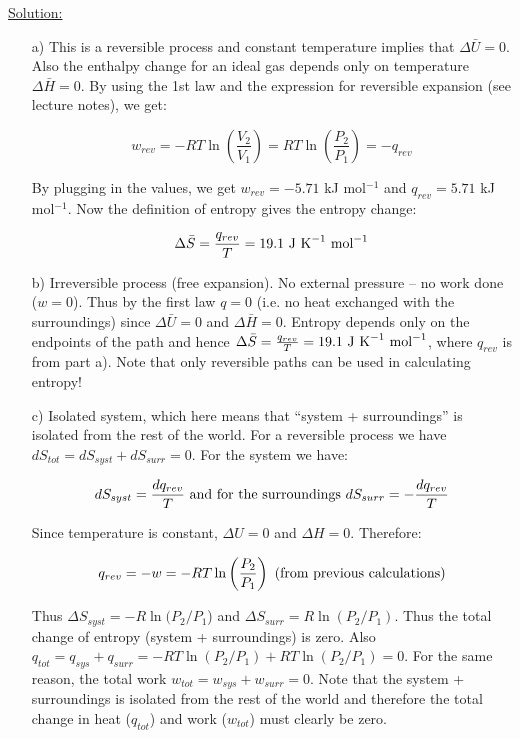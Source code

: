 \noindent
\underline{Solution:}\\

\begin{itemize}

\item[a)] This is a reversible process and constant temperature implies that $\Delta\bar{U} = 0$. Also the enthalpy change for an ideal gas depends only on temperature $\Delta\bar{H} = 0$. By using the 1st law and the expression for reversible expansion (see lecture notes), we get:

$$w_{rev} = -RT\ln\left(\frac{V_2}{V_1}\right) = RT\ln\left(\frac{P_2}{P_1}\right) = - q_{rev}$$

By plugging in the values, we get $w_{rev} = -5.71$ kJ mol$^{-1}$ and $q_{rev} = 5.71$ kJ mol$^{-1}$. Now the definition of entropy gives the entropy change:

$$\Delta\bar{S} = \frac{q_{rev}}{T} = 19.1\textnormal{ J K}^{-1}\textnormal{ mol}^{-1}$$

\item[b)] Irreversible process (free expansion). No external pressure -- no work done ($w = 0$). Thus by the first law $q = 0$ (i.e. no heat exchanged with the surroundings) since $\Delta\bar{U} = 0$ and $\Delta\bar{H} = 0$. Entropy depends only on the endpoints of the path and hence $\Delta\bar{S} = \frac{q_{rev}}{T} = 19.1\textnormal{ J K}^{-1}\textnormal{ mol}^{-1}$, where $q_{rev}$ is from part a). Note that only reversible paths can be used in calculating entropy!

\item[c)] Isolated system, which here means that ``system + surroundings'' is isolated from the rest of the world. For a reversible process we have $dS_{tot} = dS_{syst} + dS_{surr} = 0$. For the system we have:

$$dS_{syst} = \frac{dq_{rev}}{T}\textnormal{ and for the surroundings }dS_{surr} = -\frac{dq_{rev}}{T}$$

Since temperature is constant, $\Delta U = 0$ and $\Delta H = 0$. Therefore:

$$q_{rev} = -w = -RT\ln\left(\frac{P_2}{P_1}\right)\textnormal{ (from previous calculations)}$$

Thus $\Delta S_{syst} = -R\ln(P_2/P_1$) and $\Delta S_{surr}  = R\ln(P_2/P_1)$. Thus the total change of entropy (system + surroundings) is zero. Also $q_{tot} = q_{sys} + q_{surr} = -RT\ln(P_2/P_1) + RT\ln(P_2/P_1) = 0$. For the same reason, the total work $w_{tot} = w_{sys} + w_{surr} = 0$. Note that the system + surroundings is isolated from the rest of the world and therefore the total change in heat ($q_{tot}$) and work ($w_{tot}$) must clearly be zero.


\end{itemize}

